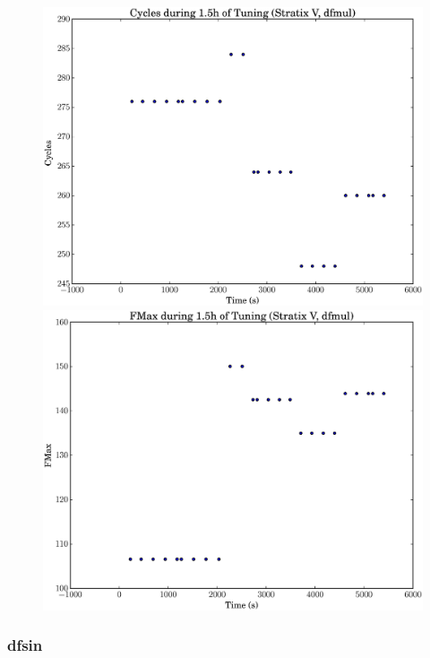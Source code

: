 \documentclass[12pt, a4paper]{article}
\begin{document}
\begin{figure}[htpb]
    \begin{minipage}{.48\textwidth}
        \includegraphics[scale=.25]{dfmul_cycles_5400_chstone_StratixV}
    \end{minipage}%
    \hfill
    \begin{minipage}{.48\textwidth}
        \includegraphics[scale=.25]{dfmul_fmax_5400_chstone_StratixV}
    \end{minipage}%
\end{figure}

\newpage

\subsubsection{dfsin}
\end{document}
